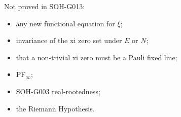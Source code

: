 Not proved in SOH-G013:
\begin{itemize}
 \item any new functional equation for \(\xi\);
 \item invariance of the xi zero set under \(E\) or \(N\);
 \item that a non-trivial xi zero must be a Pauli fixed line;
 \item PF\(_\infty\);
 \item SOH-G003 real-rootedness;
 \item the Riemann Hypothesis.
\end{itemize}
